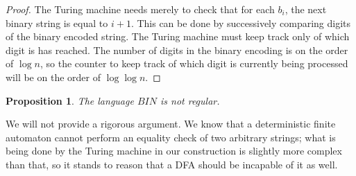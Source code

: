 \documentclass[11pt,letterpaper]{article}
\newtheorem{proposition}{Proposition}
\begin{document}
\begin{proof}
    The Turing machine needs merely to check that for each $b_i$, the next
    binary string is equal to $i + 1$. This can be done by successively
    comparing digits of the binary encoded string. The Turing machine must keep
    track only of which digit is has reached. The number of digits in the
    binary encoding is on the order of $\log n$, so the counter to keep track
    of which digit is currently being processed will be on the order of
    $\log \log n$.
\end{proof}

\begin{proposition}
    The language $BIN$ is not regular.
\end{proposition}

We will not provide a rigorous argument. We know that a deterministic finite
automaton cannot perform an equality check of two arbitrary strings; what is
being done by the Turing machine in our construction is slightly more complex
than that, so it stands to reason that a DFA should be incapable of it as well.
\end{document}
